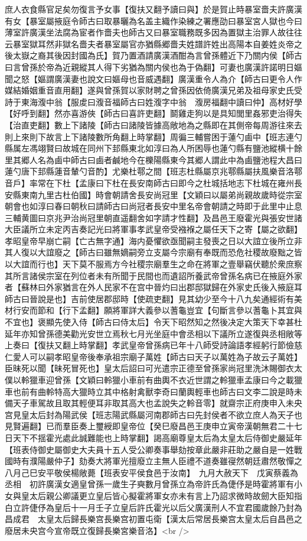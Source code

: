 庶人衣食縣官足矣勿復言予女事【復扶又翻予讀曰與】於是賀止時暴室嗇夫許廣漢有女【暴室屬掖庭令師古曰取暴曬為名盖主織作染練之署應劭曰暴室宮人獄也今曰薄室許廣漢坐法腐為宦者作嗇夫也師古又曰暴室職務既多因為置獄主治罪人故往往云暴室獄耳然非獄名嗇夫者暴室屬官亦猶縣郷嗇夫姓譜許姓出高陽本自姜姓炎帝之後太嶽之裔其後因封國為氏】賀乃置酒請廣漢酒酣為言曾孫體近下乃關内侯【師古曰言曾孫於帝為近親縱其人得下劣猶為關内侯也為于偽翻】可妻也廣漢許諾明日嫗聞之怒【嫗謂廣漢妻也說文曰嫗母也音威遇翻】廣漢重令人為介【師古曰更令人作媒結婚姻重音直用翻】遂與曾孫賀以家財聘之曾孫因依倚廣漢兄弟及祖母家史氏受詩于東海澓中翁【服䖍曰澓音福師古曰姓澓字中翁　澓房福翻中讀曰仲】高材好學【好呼到翻】然亦喜游俠【師古曰喜許吏翻】鬬雞走狗以是具知閭里姦邪吏治得失【治直吏翻】數上下諸陵【師古曰諸陵皆據高敞地為之縣即在其側帝每周游往來去則上來則下故言上下諸陵數所角翻上時掌翻】周徧三輔嘗困于蓮勺鹵中【班志連勺縣属左馮翊賢曰故城在同州下邽縣東北如淳曰為人所困辱也蓮勺縣有鹽池縱横十餘里其郷人名為鹵中師古曰鹵者鹹地今在櫟陽縣東今其郷人謂此中為鹵鹽池程大昌曰蓮勺唐下邽縣蓮音輦勺音酌】尤樂杜鄠之間【班志杜縣屬京兆鄠縣屬扶風樂音洛鄠音戶】率常在下杜【孟康曰下杜在長安南師古曰即今之杜城括地志下杜城在雍州長安縣東南九里古杜伯國】時會朝請舍長安尚冠里【文穎曰以屬弟尚親故歲時從宗室朝會也如淳曰春曰朝秋曰請師古曰尚冠者長安中里名帝會朝請之時即于此里中止息三輔黄圖曰京兆尹治尚冠里朝直遥翻舍如字請才性翻】及昌邑王廢霍光與張安世諸大臣議所立未定丙吉奏記光曰將軍事孝武皇帝受襁褓之屬任天下之寄【屬之欲翻】孝昭皇帝早崩亡嗣【亡古無字通】海内憂懼欲亟聞嗣主發喪之日以大誼立後所立非其人復以大誼廢之【師古曰雖無嫡嗣旁立支屬今宗廟有奉既而恐危社稷故廢黜之皆以大誼而行也】天下莫不服焉方今社稷宗廟羣生之命在將軍之壹舉竊伏聽於衆庶察其所言諸侯宗室在列位者未有所聞于民間也而遺詔所養武帝曾孫名病已在掖庭外家者【蘇林曰外家猶言在外人民家不在宫中晉灼曰出郡邸獄歸在外家史氏後入掖庭耳師古曰晉說是也】吉前使居郡邸時【使疏吏翻】見其幼少至今十八九矣通經術有美材行安而節和【行下孟翻】願將軍詳大義參以蓍龜豈宜【句斷言參以蓍龜卜其宜與不宜也】褒顯先使入侍【師古曰侍太后】令天下昭然知之然後决定大策天下幸甚杜延年亦知曾孫德美勸光安世立焉秋七月光坐庭中會丞相以下議所立遂復與丞相敞等上奏曰【復扶又翻上時掌翻】孝武皇帝曾孫病已年十八師受詩論語孝經躬行節儉慈仁愛人可以嗣孝昭皇帝後奉承祖宗廟子萬姓【師古曰天子以萬姓為子故云子萬姓】臣昧死以聞【昧死冒死也】皇太后詔曰可光遣宗正德至曾孫家尚冠里洗沐賜御衣太僕以軨獵車迎曾孫【文穎曰軨獵小車前有曲輿不衣近世謂之軨獵車孟康曰今之載獵車也前有曲軨特高大獵時立其中格射禽獸李奇曰蘭輿輕車也師古曰文李二說是時未備天子車駕故且取其輕便耳非取其高大也孟說失之軨音零】就齋宗正府庚申入未央宫見皇太后封為陽武侯【班志陽武縣屬河南郡師古曰先封侯者不欲立庶人為天子也見賢遍翻】已而羣臣奏上璽綬即皇帝位【癸巳廢昌邑王庚申立寅帝漢朝無君二十七日天下不揺霍光處此誠難能也上時掌翻】謁高廟尊皇太后為太皇太后侍御史嚴延年【班表侍御史屬御史大夫員十五人受公卿奏事舉劾按章此嚴非莊助之嚴自是一姓戰國時有濮陽嚴仲子】劾奏大將軍光擅廢立主無人臣禮不道奏雖寑然朝廷肅然敬憚之　八月己巳安平敬侯楊敞薨【班表安平侯食邑于汝南】　九月大赦天下　戊寅蔡義為丞相　初許廣漢女適皇曾孫一歲生子奭數月曾孫立為帝許氏為倢伃是時霍將軍有小女與皇太后親公卿議更立皇后皆心擬霍將軍女亦未有言上乃詔求微時故劒大臣知指白立許倢伃為皇后十一月壬子立皇后許氏霍光以后父廣漢刑人不宜君國歲餘乃封為昌成君　太皇太后歸長樂宫長樂宫初置屯衛【漢太后常居長樂宫太皇太后自昌邑之廢居未央宫今宣帝既立復歸長樂宮樂音洛】<br />
